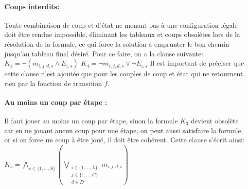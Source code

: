 \documentclass[utf8]{article}
\begin{document}
\paragraph{Coups interdits:}
Toute combinaison de coup et d'état ne menant pas à une configuration légale doit être rendue impossible, éliminant les tableaux et coups obsolètes lors de la résolution de la formule, ce qui force la solution à emprunter le bon chemin jusqu'au tableau final désiré. Pour ce faire, on a la clause suivante: \newline
$K_4 = \neg(m_{i,j,d,s}\wedge E_{\iota,s})$ \newline
$K_4 = \neg m_{i,j,d,s}\vee \neg E_{\iota,s}$ \newline
Il est important de préciser que cette clause n'est  ajoutée que pour les couples de coup et état qui ne retournent rien par la fonction de transition $f$.

\paragraph{Au moins un coup par étape :}
Il faut jouer au moins un coup par étape, sinon la formule $K_3$ devient obsolète car en ne jouant aucun coup pour une étape, on peut aussi satisfaire la formule, or si on force un coup à être joué, il doit être cohérent. Cette clause s'écrit ainsi:  \newline
$K_5 = {\underset{s \in \{1,...,S\}}{\bigwedge}}({\underset{\substack{i \in \{1,...,L\} \\ j \in \{1,...,C\} \\ d \in D}}{\bigvee}}m_{i,j,d,s})$
\end{document}
